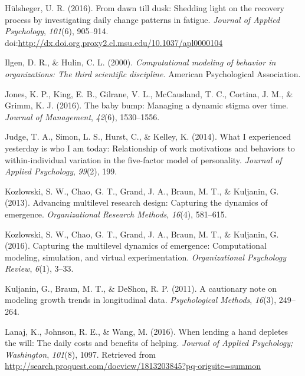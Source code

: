 \documentclass[english,,man]{apa6}
\theoremstyle{definition}
\theoremstyle{definition}
\theoremstyle{definition}
\theoremstyle{remark}
\begin{document}
\leavevmode\hypertarget{ref-hulsheger_dawn_2016}{}%
Hülsheger, U. R. (2016). From dawn till dusk: Shedding light on the
recovery process by investigating daily change patterns in fatigue.
\emph{Journal of Applied Psychology}, \emph{101}(6), 905--914.
doi:\href{https://doi.org/http://dx.doi.org.proxy2.cl.msu.edu/10.1037/apl0000104}{http://dx.doi.org.proxy2.cl.msu.edu/10.1037/apl0000104}

\leavevmode\hypertarget{ref-ilgen_computational_2000}{}%
Ilgen, D. R., \& Hulin, C. L. (2000). \emph{Computational modeling of
behavior in organizations: The third scientific discipline.} American
Psychological Association.

\leavevmode\hypertarget{ref-jones_baby_2016}{}%
Jones, K. P., King, E. B., Gilrane, V. L., McCausland, T. C., Cortina,
J. M., \& Grimm, K. J. (2016). The baby bump: Managing a dynamic stigma
over time. \emph{Journal of Management}, \emph{42}(6), 1530--1556.

\leavevmode\hypertarget{ref-judge_what_2014}{}%
Judge, T. A., Simon, L. S., Hurst, C., \& Kelley, K. (2014). What I
experienced yesterday is who I am today: Relationship of work
motivations and behaviors to within-individual variation in the
five-factor model of personality. \emph{Journal of Applied Psychology},
\emph{99}(2), 199.

\leavevmode\hypertarget{ref-kozlowski_advancing_2013}{}%
Kozlowski, S. W., Chao, G. T., Grand, J. A., Braun, M. T., \& Kuljanin,
G. (2013). Advancing multilevel research design: Capturing the dynamics
of emergence. \emph{Organizational Research Methods}, \emph{16}(4),
581--615.

\leavevmode\hypertarget{ref-kozlowski_capturing_2016}{}%
Kozlowski, S. W., Chao, G. T., Grand, J. A., Braun, M. T., \& Kuljanin,
G. (2016). Capturing the multilevel dynamics of emergence: Computational
modeling, simulation, and virtual experimentation. \emph{Organizational
Psychology Review}, \emph{6}(1), 3--33.

\leavevmode\hypertarget{ref-kuljanin2011cautionary}{}%
Kuljanin, G., Braun, M. T., \& DeShon, R. P. (2011). A cautionary note
on modeling growth trends in longitudinal data. \emph{Psychological
Methods}, \emph{16}(3), 249--264.

\leavevmode\hypertarget{ref-lanaj_when_2016}{}%
Lanaj, K., Johnson, R. E., \& Wang, M. (2016). When lending a hand
depletes the will: The daily costs and benefits of helping.
\emph{Journal of Applied Psychology; Washington}, \emph{101}(8), 1097.
Retrieved from
\url{http://search.proquest.com/docview/1813203845?pq-origsite=summon}
\end{document}
